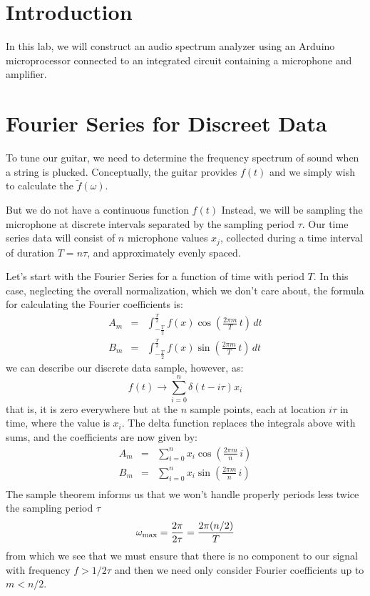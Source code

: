 \documentclass[12pt]{article}
\begin{document}
\section{Introduction}

In this lab, we will construct an audio spectrum analyzer using an Arduino
microprocessor connected to an integrated circuit containing a microphone and
amplifier.

\section{Fourier Series for Discreet Data}

To tune our guitar, we need to determine the frequency spectrum of sound when a string is plucked.   Conceptually, the guitar provides $f(t)$ and we simply wish to calculate the $\widetilde{f}(\omega)$.

But we do not have a continuous function $f(t)$   Instead, we will be sampling the microphone at discrete intervals separated by the sampling period $\tau$.  Our time series data will consist of $n$ microphone values $x_j$, collected during a time interval of duration $T = n\tau$, and approximately evenly spaced.  

Let's start with the Fourier Series for a function of time with period $T$.  In this case, neglecting the overall normalization, which we don't care about, the formula for calculating the Fourier coefficients is:
\begin{eqnarray*}
A_m &=&  \int_{-\frac{T}{2}}^{\frac{T}{2}} 
f(x) \cos\left(\frac{2\pi m}{T} \, t \right) \, dt \\
B_m &=& \int_{-\frac{T}{2}}^{\frac{T}{2}} 
f(x) \sin\left(\frac{2\pi m}{T} \, t \right) \, dt
\end{eqnarray*}
we can describe our discrete data sample, however, as:
\begin{equation*}
f(t) \to \sum_{i=0}^n \delta(t-i\tau) x_i
\end{equation*}
that is, it is zero everywhere but at the $n$ sample points, each at location $i\tau$ in time, where the value is $x_i$.
The delta function replaces the integrals above with sums, and the coefficients are now given by:
\begin{eqnarray*}
A_m &=&  \sum_{i=0}^n x_i  \cos\left(\frac{2\pi m}{n} \, i \right) \\
B_m &=&  \sum_{i=0}^n x_i  \sin\left(\frac{2\pi m}{n} \, i \right) \\
\end{eqnarray*}
The sample theorem informs us that we won't handle properly periods less twice the sampling period $\tau$
\begin{displaymath}
\omega_{\rm max} = \frac{2 \pi}{ 2 \tau} = \frac{2 \pi (n/2)}{T}
\end{displaymath}
from which we see that we must ensure that there is no component to our signal with frequency $f > 1/2\tau$ and then we need only consider Fourier coefficients up to $m < n/2$.
\end{document}
